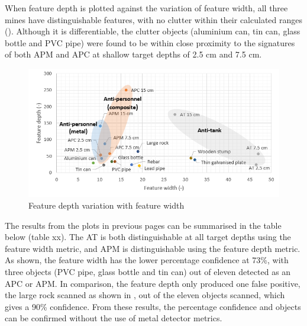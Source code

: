 \documentclass[main.tex]{subfiles}
\begin{document}
When feature depth is plotted against the variation of feature width, all three mines have distinguishable features, with no clutter within their calculated ranges (). Although it is differentiable, the clutter objects (aluminium can, tin can, glass bottle and PVC pipe) were found to be within close proximity to the signatures of both APM and APC at shallow target depths of 2.5 cm and 7.5 cm.

\begin{figure}[!ht]
\includegraphics[width=\textwidth]{5-Testing/depthWidth.PNG}
\centering
\caption{Feature depth variation with feature width}
\end{figure}

The results from the plots in previous pages can be summarised in the table below (table xx). The AT is both distinguishable at all target depths using the feature width metric, and APM is distinguishable using the feature depth metric. As shown, the feature width has the lower percentage confidence at 73\%, with three objects (PVC pipe, glass bottle and tin can) out of eleven detected as an APC or APM. In comparison, the feature depth only produced one false positive, the large rock scanned as shown in , out of the eleven objects scanned, which gives a 90\% confidence. From these results, the percentage confidence and objects can be confirmed without the use of metal detector metrics. 
\end{document}
